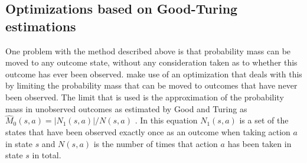 \subsection{Optimizations based on Good-Turing estimations}
\label{sec:mbie_gt}

One problem with the method described above is that probability mass can be
moved to any outcome state, without any consideration taken as to whether this
outcome has ever been observed. \textcite{dietterich2013pac} make
use of an optimization that deals with this by limiting the probability mass
that can be moved to outcomes that have never been observed. The limit that is used is the approximation
of the probability mass in unobserved outcomes as estimated by Good and Turing
as $\hat{M}_0(s,a) = |N_1(s,a)| / N(s,a)$ \parencite{gtpaper}. In this
equation $N_1(s,a)$ is a set of the states that have been observed exactly
once as an outcome when taking action $a$ in state $s$ and $N(s,a)$ is the
number of times that action $a$ has been taken in state $s$ in total. 
